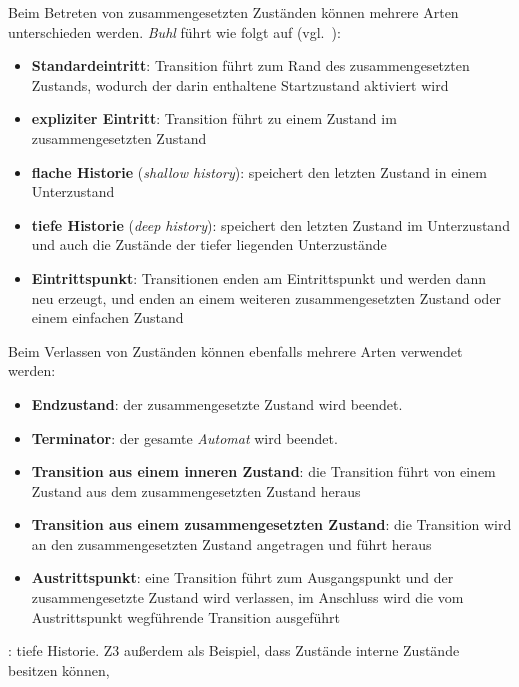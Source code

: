 \noindent
Beim Betreten von zusammengesetzten Zuständen können mehrere Arten unterschieden werden. \textit{Buhl} führt wie folgt auf (vgl.~\cite[73]{Buh09}):

\begin{itemize}
    \item \textbf{Standardeintritt}: Transition führt zum Rand des zusammengesetzten Zustands, wodurch der darin enthaltene Startzustand aktiviert wird
    \item \textbf{expliziter Eintritt}: Transition führt zu einem Zustand im zusammengesetzten Zustand
    \item \textbf{flache Historie} (\textit{shallow history}): speichert den letzten Zustand in einem Unterzustand
    \item \textbf{tiefe Historie} (\textit{deep history}): speichert den letzten Zustand im Unterzustand und auch die Zustände der tiefer liegenden Unterzustände
    \item \textbf{Eintrittspunkt}: Transitionen enden am Eintrittspunkt und werden dann neu erzeugt, und enden an einem weiteren zusammengesetzten Zustand oder einem einfachen Zustand
\end{itemize}

\noindent
Beim Verlassen von Zuständen können ebenfalls mehrere Arten verwendet werden:

\begin{itemize}
    \item \textbf{Endzustand}: der zusammengesetzte Zustand wird beendet.
    \item \textbf{Terminator}: der gesamte \textit{Automat} wird beendet.
    \item \textbf{Transition aus einem inneren Zustand}: die Transition führt von einem Zustand aus dem zusammengesetzten Zustand heraus
    \item \textbf{Transition aus einem zusammengesetzten Zustand}: die Transition wird an den zusammengesetzten Zustand angetragen und führt heraus
    \item \textbf{Austrittspunkt}: eine Transition führt zum Ausgangspunkt und der zusammengesetzte Zustand wird verlassen, im Anschluss wird die vom Austrittspunkt wegführende Transition ausgeführt
\end{itemize}


\begin{tcolorbox}[colback=yellow!20]
\cite[Abb. 6.11.7, 342]{Bal05}: tiefe Historie. Z3 außerdem als Beispiel, dass Zustände interne Zustände besitzen können,
\end{tcolorbox}

